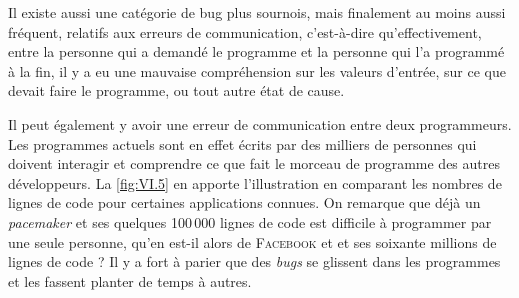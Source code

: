Il existe aussi une catégorie de bug plus sournois, mais finalement au moins aussi fréquent, relatifs aux erreurs de communication, c'est-à-dire qu'effectivement, entre la personne qui a demandé le programme et la personne qui l'a programmé à la fin, il y a eu une mauvaise compréhension sur les valeurs d'entrée, sur ce que devait faire le programme, ou tout autre état de cause. 
 
Il peut également y avoir une erreur de communication entre deux programmeurs. Les programmes actuels sont en effet écrits par des milliers de personnes qui doivent interagir et comprendre ce que fait le morceau de programme des autres développeurs. La \cref{fig:VI.5} en apporte l'illustration en comparant les nombres de lignes de code pour certaines applications connues. On remarque que déjà un \textit{pacemaker} et ses quelques 100\,000 lignes de code est difficile à programmer par une seule personne, qu'en est-il alors de \textsc{Facebook} et et ses soixante millions de lignes de code ? Il y a fort à parier que des \textit{bugs} se glissent dans les programmes et les fassent planter de temps à autres.





